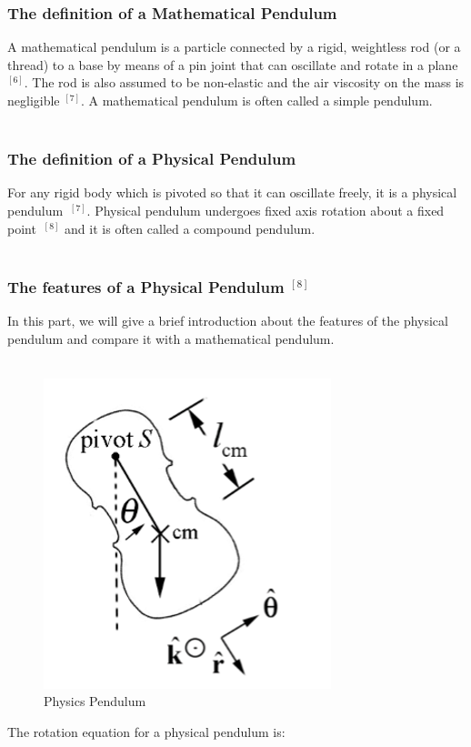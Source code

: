 \documentclass[12pt,a4paper]{article}
\begin{document}
\subsubsection{The definition of a Mathematical Pendulum} 
A mathematical pendulum is a particle connected by a rigid, weightless rod (or a thread) to a base by means of a pin joint that can oscillate and rotate in a plane $^{[6]}$. The rod is also assumed to be non-elastic and the air viscosity on the mass is negligible $^{[7]}$. A mathematical pendulum is often called a simple pendulum. \\
~\\
\subsubsection{The definition of a Physical Pendulum} 
For any rigid body which is pivoted so that it can oscillate freely, it is a physical pendulum $~^{[7]}$. Physical pendulum undergoes fixed axis rotation about a fixed point $~^{[8]}$ and it is often called a compound pendulum.\\
~\\
\subsubsection{The features of a Physical Pendulum $^{[8]}$} 
In this part, we will give a brief introduction about the features of the physical pendulum and compare it with a mathematical pendulum.\\
~\\
\begin{figure}[H]
\centering
\includegraphics{1-1.png}
\caption{Physics Pendulum}
\end{figure} 
The rotation equation for a physical pendulum is:
\end{document}
